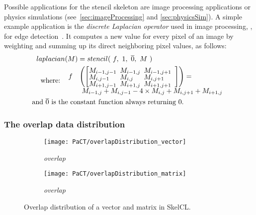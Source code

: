 Possible applications for the stencil skeleton are image processing applications or physics simulations (see~\autoref{sec:imageProcessing} and \autoref{sec:physicsSim}).
A simple example application is the \emph{discrete Laplacian operator} used in image processing, \eg, for edge detection~\cite{Umbaugh1997}.
It computes a new value for every pixel of an image by weighting and summing up its direct neighboring pixel values, as follows:
\begin{align*}
  laplacian&(M) = stencil(\ f,\ 1,\ \overline{0},\ M\ )\\
  \text{where:} \ \ &
  \begin{array}{ll}%
  f &\left(\left[\begin{array}{lll}%
      \hspace{-.5em} M_{i-1,j-1}& \hspace{-.5em} M_{i-1,j} & \hspace{-.5em}M_{i-1,j+1}\vspace{-.25em}\\%
      \hspace{-.5em} M_{i,j-1}& \hspace{-.5em} M_{i,j} & \hspace{-.5em}M_{i,j+1}\vspace{-.25em}\\%
      \hspace{-.5em} M_{i+1,j-1}& \hspace{-.5em} M_{i+1,j} & \hspace{-.5em}M_{i+1,j+1}\vspace{-.25em}
    \end{array}\right] \right) = \\
          &\ M_{i-1,j} + M_{i,j-1} - 4 \times M_{i,j} + M_{i,j+1} + M_{i+1,j}
  \end{array} \\
  \text{and } \overline{0} \text{ is th}&\text{e constant function always returning 0.}
\end{align*}

\subsubsection{The overlap data distribution}

\begin{figure}[tb]
  \centering
  \begin{subfigure}[b]{.3\textwidth}
    \texttt{[image: PaCT/overlapDistribution\_vector]}
    \caption{\emph{overlap}}
    \label{fig:overlap_distribution}
  \end{subfigure}
  \hspace{3em}
  \begin{subfigure}[b]{.22\textwidth}
    \texttt{[image: PaCT/overlapDistribution\_matrix]}
    \caption{\emph{overlap}}
    \label{fig:overlap_distribution:matrix}
  \end{subfigure}
  \caption{Overlap distribution of a vector and matrix in SkelCL.}
  \label{fig:overlap_distribution}
  \bigskip
\end{figure}

